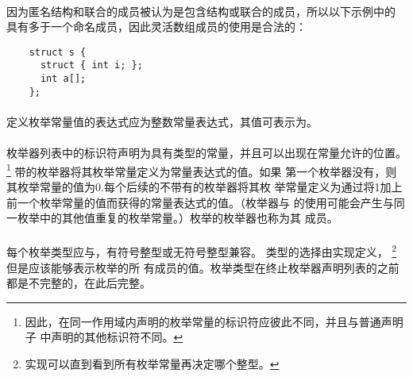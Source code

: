 \paragraph{}
\ex 因为匿名结构和联合的成员被认为是包含结构或联合的成员，所以以下示例中的
具有多于一个命名成员，因此灵活数组成员的使用是合法的：
\begin{lstlisting}
    struct s {
      struct { int i; };
      int a[];
    };
\end{lstlisting}


\syntax
\paragraph{}

\constraint
\paragraph{}
定义枚举常量值的表达式应为整数常量表达式，其值可表示为。

\semantic
\paragraph{}
枚举器列表中的标识符声明为具有类型的常量，并且可以出现在常量允许的位置。
\footnote{因此，在同一作用域内声明的枚举常量的标识符应彼此不同，并且与普通声明子
中声明的其他标识符不同。} 带\tm{=}的枚举器将其枚举常量定义为常量表达式的值。如果
第一个枚举器没有\tm{=}，则其枚举常量的值为0.每个后续的不带有\tm{=}的枚举器将其枚
举常量定义为通过将1加上前一个枚举常量的值而获得的常量表达式的值。（枚举器与
\tm{=}的使用可能会产生与同一枚举中的其他值重复的枚举常量。）枚举的枚举器也称为其
成员。

\paragraph{}
每个枚举类型应与，有符号整型或无符号整型兼容。 类型的选择由实现定义，
\footnote{实现可以直到看到所有枚举常量再决定哪个整型。} 但是应该能够表示枚举的所
有成员的值。枚举类型在终止枚举器声明列表的\tm{\}}之前都是不完整的，在此后完整。

